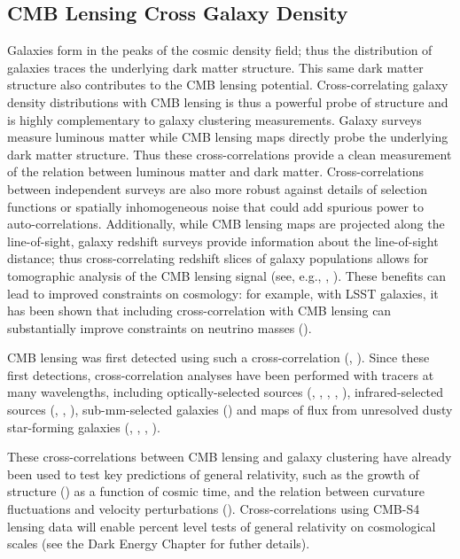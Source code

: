 \subsection{CMB Lensing Cross Galaxy Density}
Galaxies form in the peaks of the cosmic density field; thus the distribution of galaxies traces the underlying dark matter structure.  This same dark matter structure also contributes to the CMB lensing potential.
Cross-correlating galaxy density distributions with CMB lensing is thus a powerful probe of structure and is highly complementary to galaxy clustering measurements.
Galaxy surveys measure luminous matter while CMB lensing maps directly probe the underlying dark matter structure. Thus these cross-correlations provide a clean measurement of the relation between luminous matter and dark matter.
Cross-correlations between independent surveys are also more robust against details of selection functions or spatially inhomogeneous noise that could add spurious power to auto-correlations.
Additionally, while CMB lensing maps are projected along the line-of-sight, galaxy redshift surveys provide information about the line-of-sight distance; thus cross-correlating redshift slices of galaxy populations allows for tomographic analysis of the CMB lensing signal (see, e.g., \cite{Baxter:2016ziy}, \cite{Miyatake:2016gdc}).
These benefits can lead to improved constraints on cosmology: for example, with LSST galaxies, it has been shown that including cross-correlation with CMB lensing can substantially improve constraints on neutrino masses (\cite{Pearson:2013iha}).


CMB lensing was first detected using such a cross-correlation (\cite{Smith:2007rg}, \cite{Hirata:2008cb}).  Since these first detections, cross-correlation analyses have been performed with tracers at many wavelengths, including optically-selected sources (\cite{Bleem:2012gm}, \cite{Sherwin:2012mr}, \cite{Ade:2013tyw}, \cite{Baxter:2016ziy}, \cite{Pullen:2015vtb}), infrared-selected sources (\cite{Bleem:2012gm}, \cite{Geach:2013zwa}, \cite{DiPompeo:2014yea}), sub-mm-selected galaxies (\cite{Bianchini:2014dla}) and maps of flux from unresolved dusty star-forming galaxies (\cite{Holder:2013hqu}, \cite{Hanson:2013daa}, \cite{Ade:2013aro}, \cite{vanEngelen:2014zlh}). 

These cross-correlations between CMB lensing and galaxy clustering have already been used to test key predictions of general relativity, such as the growth of structure (\cite{Baxter:2016ziy}) as a function of cosmic time, and the relation between curvature fluctuations and velocity perturbations (\cite{Pullen:2015vtb}). Cross-correlations using CMB-S4 lensing data will enable percent level tests of general relativity on cosmological scales (see the Dark Energy Chapter for futher details).

